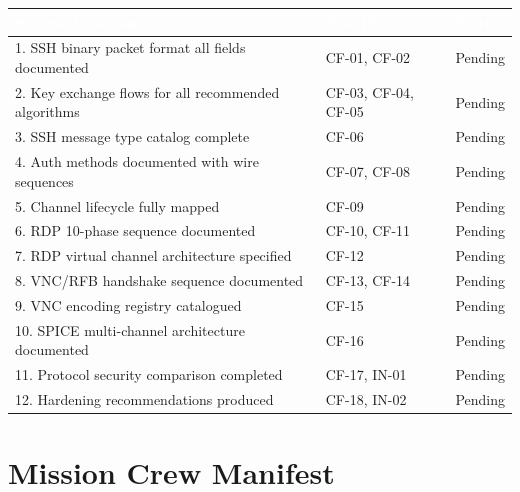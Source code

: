 \documentclass[11pt,letterpaper]{article}
\newcommand{\tableheader}[1]{\textbf{\sffamily\textcolor{white}{#1}}}
\begin{document}
\begin{center}
\begin{tabularx}{\textwidth}{L{7cm}L{3.5cm}C{1.5cm}}
\toprule
{}
\tableheader{Success Criterion} & \tableheader{Test ID(s)} & \tableheader{Status} \\
. SSH binary packet format all fields documented & CF-01, CF-02 & Pending \\
2. Key exchange flows for all recommended algorithms & CF-03, CF-04, CF-05 & Pending \\
3. SSH message type catalog complete & CF-06 & Pending \\
4. Auth methods documented with wire sequences & CF-07, CF-08 & Pending \\
5. Channel lifecycle fully mapped & CF-09 & Pending \\
6. RDP 10-phase sequence documented & CF-10, CF-11 & Pending \\
7. RDP virtual channel architecture specified & CF-12 & Pending \\
8. VNC/RFB handshake sequence documented & CF-13, CF-14 & Pending \\
9. VNC encoding registry catalogued & CF-15 & Pending \\
10. SPICE multi-channel architecture documented & CF-16 & Pending \\
11. Protocol security comparison completed & CF-17, IN-01 & Pending \\
12. Hardening recommendations produced & CF-18, IN-02 & Pending \\
\bottomrule
\end{tabularx}
\end{center}

\section{Mission Crew Manifest}
\end{document}
